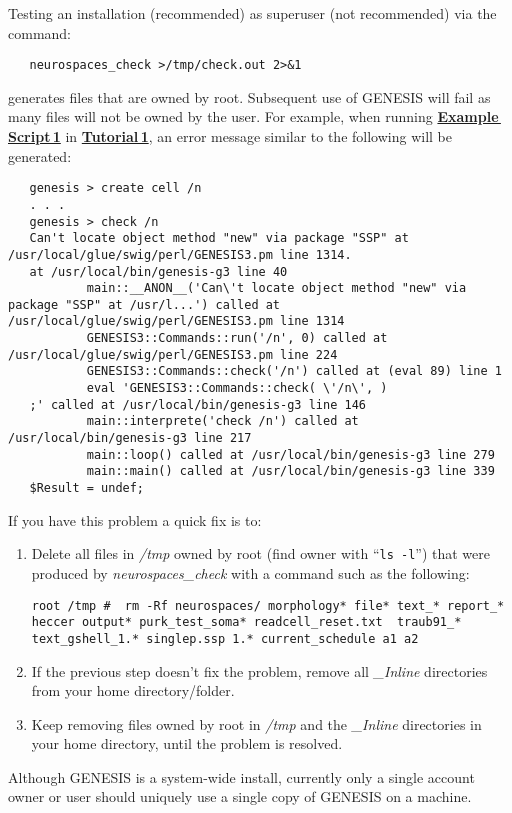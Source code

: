 \documentclass[12pt]{article}
\begin{document}
\begin{enumerate}
Testing an installation (recommended) as superuser (not recommended) via the command:
\begin{verbatim}
   neurospaces_check >/tmp/check.out 2>&1
\end{verbatim}
generates files that are owned by root. Subsequent use of GENESIS will fail as many files will not be owned by the user. For example, when running \href{../example-script1/example-script1.tex}{\bf Example\,Script\,1} in \href{../tutorial1/tutorial1.tex}{\bf Tutorial\,1}, an error message similar to the following will be generated:
\begin{verbatim}
   genesis > create cell /n
   . . .
   genesis > check /n
   Can't locate object method "new" via package "SSP" at /usr/local/glue/swig/perl/GENESIS3.pm line 1314.
   at /usr/local/bin/genesis-g3 line 40
           main::__ANON__('Can\'t locate object method "new" via package "SSP" at /usr/l...') called at /usr/local/glue/swig/perl/GENESIS3.pm line 1314
           GENESIS3::Commands::run('/n', 0) called at /usr/local/glue/swig/perl/GENESIS3.pm line 224
           GENESIS3::Commands::check('/n') called at (eval 89) line 1
           eval 'GENESIS3::Commands::check( \'/n\', )
   ;' called at /usr/local/bin/genesis-g3 line 146
           main::interprete('check /n') called at /usr/local/bin/genesis-g3 line 217
           main::loop() called at /usr/local/bin/genesis-g3 line 279
           main::main() called at /usr/local/bin/genesis-g3 line 339
   $Result = undef;
 \end{verbatim}
 If you have this problem a quick fix is to:
 \begin{enumerate}
    \item Delete all files in {\it /tmp} owned by root (find owner with ``{\tt ls -l}'') that were produced by {\it neurospaces\_check} with a command such as the following:
    \begin{verbatim}
root /tmp #  rm -Rf neurospaces/ morphology* file* text_* report_* heccer output* purk_test_soma* readcell_reset.txt  traub91_* text_gshell_1.* singlep.ssp 1.* current_schedule a1 a2
    \end{verbatim}
    
    \item If the previous step doesn't fix the problem, remove all {\it \_Inline} directories from your home directory/folder.
    
    \item Keep removing files owned by root in {\it /tmp} and the {\it \_Inline} directories in your home directory, until the problem is resolved.
 \end{enumerate}
 Although GENESIS is a system-wide install, currently only a single account owner or user should uniquely use a single copy of GENESIS on a machine.
\end{enumerate}
\end{document}
